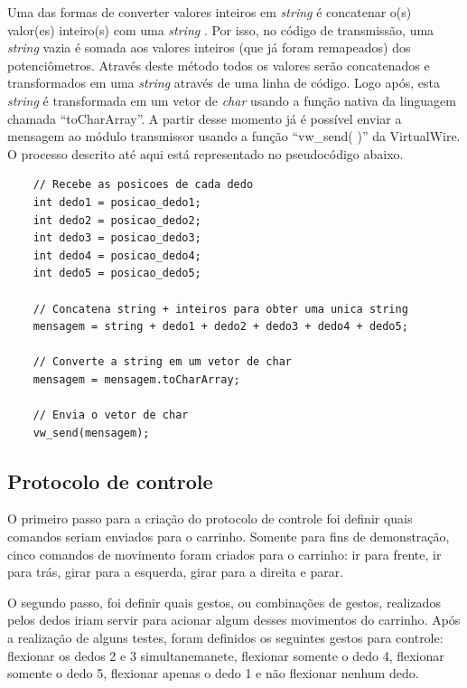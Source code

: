 \documentclass[
	12pt,				%
	openright,			%
	oneside,			%
	a4paper,			%
	english,			%
	brazil				%
	]{abntex2}
\begin{document}
		Uma das formas de converter valores inteiros em \textit{string} é concatenar o(s) valor(es) inteiro(s) com uma \textit{string} \cite{arduinostringadd}. Por isso, no código de transmissão, uma \textit{string} vazia é somada aos valores inteiros (que já foram remapeados) dos potenciômetros. Através deste método todos os valores serão concatenados e transformados em uma \textit{string} através de uma linha de código. Logo após, esta \textit{string} é transformada em um vetor de \textit{char} usando a função nativa da linguagem chamada ``toCharArray''. A partir desse momento já é possível enviar a mensagem ao módulo transmissor usando a função ``vw\_send( )'' da VirtualWire. O processo descrito até aqui está representado no pseudocódigo abaixo.		
\begin{lstlisting}	
	// Recebe as posicoes de cada dedo
	int dedo1 = posicao_dedo1;
	int dedo2 = posicao_dedo2;
	int dedo3 = posicao_dedo3;
	int dedo4 = posicao_dedo4;
	int dedo5 = posicao_dedo5;

	// Concatena string + inteiros para obter uma unica string
	mensagem = string + dedo1 + dedo2 + dedo3 + dedo4 + dedo5;

	// Converte a string em um vetor de char
	mensagem = mensagem.toCharArray;

	// Envia o vetor de char
	vw_send(mensagem);
\end{lstlisting}

				
		\subsection{Protocolo de controle} \label{sub:protocolo-de-controle}

		O primeiro passo para a criação do protocolo de controle foi definir quais comandos seriam enviados para o carrinho. Somente para fins de demonstração, cinco comandos de movimento foram criados para o carrinho: ir para frente, ir para trás, girar para a esquerda, girar para a direita e parar.

		O segundo passo, foi definir quais gestos, ou combinações de gestos, realizados pelos dedos iriam servir para acionar algum desses movimentos do carrinho. Após a realização de alguns testes, foram definidos os seguintes gestos para controle: flexionar os dedos 2 e 3 simultanemanete, flexionar somente o dedo 4, flexionar somente o dedo 5, flexionar apenas o dedo 1 e não flexionar nenhum dedo.
\end{document}

